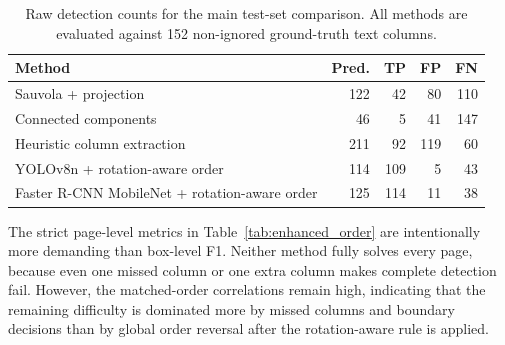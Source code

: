 \documentclass[12pt]{article}
\begin{document}
\begin{table}[t]
\centering
\caption{Raw detection counts for the main test-set comparison. All methods are evaluated against 152 non-ignored ground-truth text columns.}
\label{tab:main_counts}
\begin{tabular}{lrrrr}
\toprule
Method & Pred. & TP & FP & FN \\
\midrule
Sauvola + projection & 122 & 42 & 80 & 110 \\
Connected components & 46 & 5 & 41 & 147 \\
Heuristic column extraction & 211 & 92 & 119 & 60 \\
YOLOv8n + rotation-aware order & 114 & 109 & 5 & 43 \\
Faster R-CNN MobileNet + rotation-aware order & 125 & 114 & 11 & 38 \\
\bottomrule
\end{tabular}
\end{table}

\begin{table}[t]
\centering
\caption{Supplementary page-level and reading-order metrics on the test split. Complete detection requires zero false positives and zero false negatives on a page; full-page success additionally requires perfect reading order among matched columns.}
\label{tab:enhanced_order}
\end{table}

The strict page-level metrics in Table~\ref{tab:enhanced_order} are intentionally more demanding than box-level F1. Neither method fully solves every page, because even one missed column or one extra column makes complete detection fail. However, the matched-order correlations remain high, indicating that the remaining difficulty is dominated more by missed columns and boundary decisions than by global order reversal after the rotation-aware rule is applied.
\end{document}
